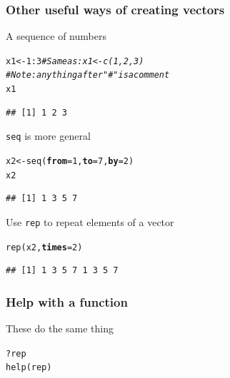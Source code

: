 \documentclass[color=usenames,dvipsnames]{beamer}\usepackage[]{graphicx}\usepackage[]{color}
\makeatletter
\newcommand{\hlnum}[1]{\textcolor[rgb]{0.69,0.494,0}{#1}}%
\newcommand{\hlcom}[1]{\textcolor[rgb]{0.514,0.506,0.514}{\textit{#1}}}%
\newcommand{\hlopt}[1]{\textcolor[rgb]{0,0,0}{#1}}%
\newcommand{\hlstd}[1]{\textcolor[rgb]{0,0,0}{#1}}%
\newcommand{\hlkwb}[1]{\textcolor[rgb]{0,0.341,0.682}{#1}}%
\newcommand{\hlkwc}[1]{\textcolor[rgb]{0,0,0}{\textbf{#1}}}%
\newcommand{\hlkwd}[1]{\textcolor[rgb]{0.004,0.004,0.506}{#1}}%
\newenvironment{kframe}{%
 \def\at@end@of@kframe{}%
 \ifinner\ifhmode%
  \def\at@end@of@kframe{\end{minipage}}%
  \begin{minipage}{\columnwidth}%
 \fi\fi%
 \def\FrameCommand##1{\hskip\@totalleftmargin \hskip-\fboxsep
 \colorbox{shadecolor}{##1}\hskip-\fboxsep
     \hskip-\linewidth \hskip-\@totalleftmargin \hskip\columnwidth}%
 \MakeFramed {\advance\hsize-\width
   \@totalleftmargin\z@ \linewidth\hsize
   \@setminipage}}%
 {\par\unskip\endMakeFramed%
 \at@end@of@kframe}
\newenvironment{knitrout}{}{} %
\newcommand{\inr}[1]{\colorbox{inlinecolor}{\texttt{#1}}}
\makeatother
\begin{document}
%


\begin{frame}[fragile]
  \frametitle{Other useful ways of creating vectors}
A sequence of numbers
\begin{knitrout}\small
{}\color{fgcolor}\begin{kframe}
\begin{alltt}
\hlstd{x1} \hlkwb{<-} \hlnum{1}\hlopt{:}\hlnum{3} \hlcom{# Same as: x1 <- c(1, 2, 3)}
          \hlcom{# Note: anything after "#" is a comment}
\hlstd{x1}
\end{alltt}
\begin{verbatim}
## [1] 1 2 3
\end{verbatim}
\end{kframe}
\end{knitrout}
\pause \vfill
\inr{seq} is more general
\begin{knitrout}\small
{}\color{fgcolor}\begin{kframe}
\begin{alltt}
\hlstd{x2} \hlkwb{<-} \hlkwd{seq}\hlstd{(}\hlkwc{from}\hlstd{=}\hlnum{1}\hlstd{,} \hlkwc{to}\hlstd{=}\hlnum{7}\hlstd{,} \hlkwc{by}\hlstd{=}\hlnum{2}\hlstd{)}
\hlstd{x2}
\end{alltt}
\begin{verbatim}
## [1] 1 3 5 7
\end{verbatim}
\end{kframe}
\end{knitrout}
\pause \vfill
Use \inr{rep} to repeat elements of a vector
\begin{knitrout}\small
{}\color{fgcolor}\begin{kframe}
\begin{alltt}
\hlkwd{rep}\hlstd{(x2,} \hlkwc{times}\hlstd{=}\hlnum{2}\hlstd{)}
\end{alltt}
\begin{verbatim}
## [1] 1 3 5 7 1 3 5 7
\end{verbatim}
\end{kframe}
\end{knitrout}
\end{frame}



\begin{frame}[fragile]
  \frametitle{Help with a function}
\LARGE
These do the same thing
\begin{knitrout}
\color{fgcolor}\begin{kframe}
\begin{alltt}
\hlopt{?}\hlstd{rep}
\hlkwd{help}\hlstd{(rep)}
\end{alltt}
\end{kframe}
\end{knitrout}
\end{frame}
\end{document}
